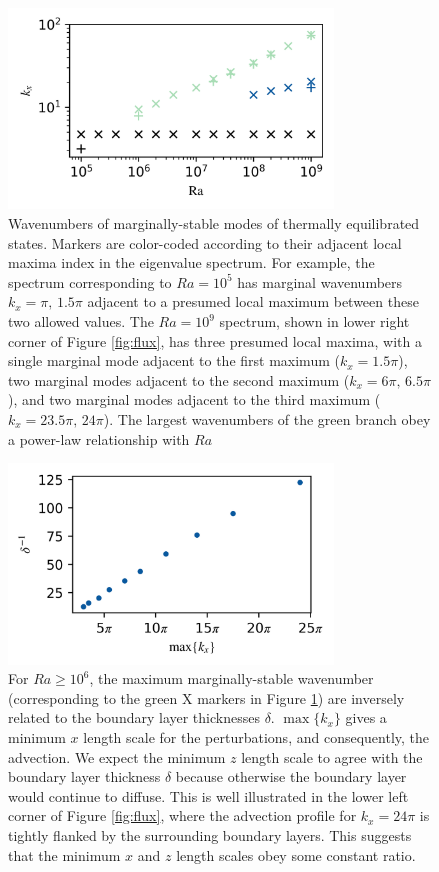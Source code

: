 \documentclass[twocolumn,showpacs,amsmath,amssymb]{revtex4}
\begin{document}
\begin{figure}[h]
    \centering
    \includegraphics[width=3.4in]{kx_m_ra1.png}
    \caption{Wavenumbers of marginally-stable modes of thermally equilibrated states. Markers are color-coded according to their adjacent local maxima index in the eigenvalue spectrum. For example, the spectrum corresponding to $Ra = 10^5$ has marginal wavenumbers $k_x = \pi, \, 1.5\pi$ adjacent to a presumed local maximum between these two allowed values. The $Ra = 10^9$ spectrum, shown in lower right corner of Figure \ref{fig:flux}, has three presumed local maxima, with a single marginal mode adjacent to the first maximum ($k_x = 1.5\pi$), two marginal modes adjacent to the second maximum ($k_x = 6\pi, \, 6.5\pi$), and two marginal modes adjacent to the third maximum ($k_x = 23.5\pi, \, 24\pi$). The largest wavenumbers of the green branch obey a power-law relationship with $Ra$}
    \label{fig:kx_marginals}
\end{figure}






\begin{figure}[h]
    \centering
    \includegraphics[width=3.4in]{del_kx_inv.png}
    \caption{For $Ra \geq 10^6$, the maximum marginally-stable wavenumber (corresponding to the green X markers in Figure \ref{fig:kx_marginals}) are inversely related to the boundary layer thicknesses $\delta$. $\max \{ k_x \}$ gives a minimum $x$ length scale for the perturbations, and consequently, the advection. We expect the minimum $z$ length scale to agree with the boundary layer thickness $\delta$ because otherwise the boundary layer would continue to diffuse. This is well illustrated in the lower left corner of Figure \ref{fig:flux}, where the advection profile for $k_x = 24\pi$ is tightly flanked by the surrounding boundary layers. This suggests that the minimum $x$ and $z$ length scales obey some constant ratio.}
    \label{fig:my_label}
\end{figure}
\end{document}

